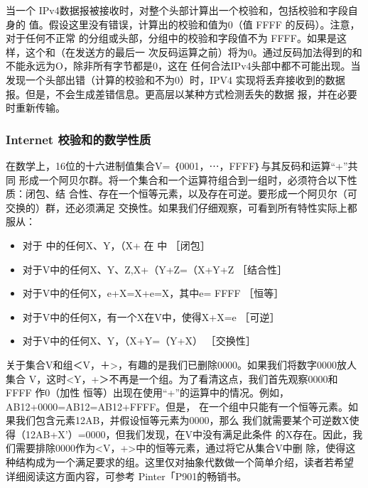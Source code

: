 当一个 IPv4数据报被接收时，对整个头部计算出一个校验和，包括校验和字段自身的
值。假设这里没有错误，计算出的校验和值为0（值 FFFF 的反码）。注意，对于任何不正常
的分组或头部，分组中的校验和字段值不为 FFFF。如果是这样，这个和（在发送方的最后一
次反码运算之前）将为0。通过反码加法得到的和不能永远为O，除非所有字节都是0，这在
任何合法IPv4头部中都不可能出现。当发现一个头部出错（计算的校验和不为0）时，IPV4
实现将丢弃接收到的数据报。但是，不会生成差错信息。更高层以某种方式检测丢失的数据
报，并在必要时重新传输。

\subsubsection{Internet 校验和的数学性质}
在数学上，16位的十六进制值集合V= ｛0001，⋯，FFFF｝与其反码和运算“+”共同
形成一个阿贝尔群。将一个集合和一个运算符组合到一组时，必须符合以下性质：闭包、结
合性、存在一个恒等元素，以及存在可逆。要形成一个阿贝尔（可交换的）群，还必须满足
交换性。如果我们仔细观察，可看到所有特性实际上都服从：

\begin{itemize}
    \item 对于 中的任何X、Y，（X+ 在 中           ［闭包］
    \item 对于V中的任何X、Y、Z,X+（Y+Z=（X+Y+Z    ［结合性］
    \item 对于V中的任何X，e+X=X+e=X，其中e= FFFF      ［恒等］
    \item 对于V中的任何X，有一个X在V中，使得X+X=e         ［可逆］
    \item 对于V中的任何X、Y，（X+Y=（Y+X）                ［交换性］
\end{itemize}

关于集合V和组＜V，＋>，有趣的是我们已删除0000。如果我们将数字0000放人集合
V，这时<Y，+＞不再是一个组。为了看清这点，我们首先观察0000和 FFFF 作0（加性
恒等）出现在使用“+”的运算中的情况。例如，AB12+0000=AB12=AB12+FFFF。但是，
在一个组中只能有一个恒等元素。如果我们包含元素12AB，并假设恒等元素为0000，那么
我们就需要某个可逆数X使得（12AB+X'）=0000，但我们发现，在V中没有满足此条件
的X存在。因此，我们需要排除0000作为<V，+>中的恒等元素，通过将它从集合V中删
除，使得这种结构成为一个满足要求的组。这里仅对抽象代数做一个简单介绍，读者若希望
详细阅读这方面内容，可参考 Pinter「P901的畅销书。

